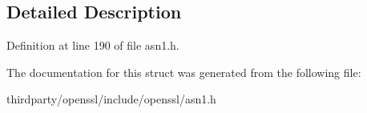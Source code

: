 \subsection{Detailed Description}


Definition at line 190 of file asn1.\+h.



The documentation for this struct was generated from the following file\+:\begin{DoxyCompactItemize}
\item 
thirdparty/openssl/include/openssl/asn1.\+h\end{DoxyCompactItemize}
